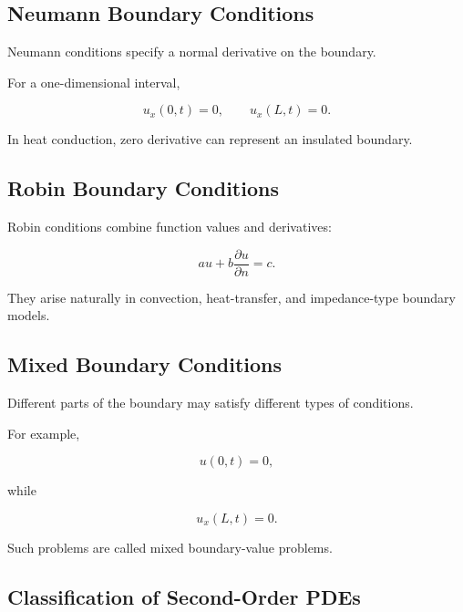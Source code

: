 \subsection{Neumann Boundary Conditions}
\label{subsec:neumann-boundary-conditions}

Neumann conditions specify a normal derivative on the boundary.

For a one-dimensional interval,

\[
\boxed{
u_x(0,t)=0,
\qquad
u_x(L,t)=0.
}
\]

In heat conduction, zero derivative can represent an insulated boundary.

\subsection{Robin Boundary Conditions}
\label{subsec:robin-boundary-conditions}

Robin conditions combine function values and derivatives:

\[
\boxed{
a u
+
b\frac{\partial u}{\partial n}
=
c.
}
\]

They arise naturally in convection, heat-transfer, and impedance-type
boundary models.

\subsection{Mixed Boundary Conditions}
\label{subsec:mixed-boundary-conditions}

Different parts of the boundary may satisfy different types of
conditions.

For example,

\[
u(0,t)=0,
\]

while

\[
u_x(L,t)=0.
\]

Such problems are called mixed boundary-value problems.

\subsection{Classification of Second-Order PDEs}
\label{subsec:second-order-pde-classification}

